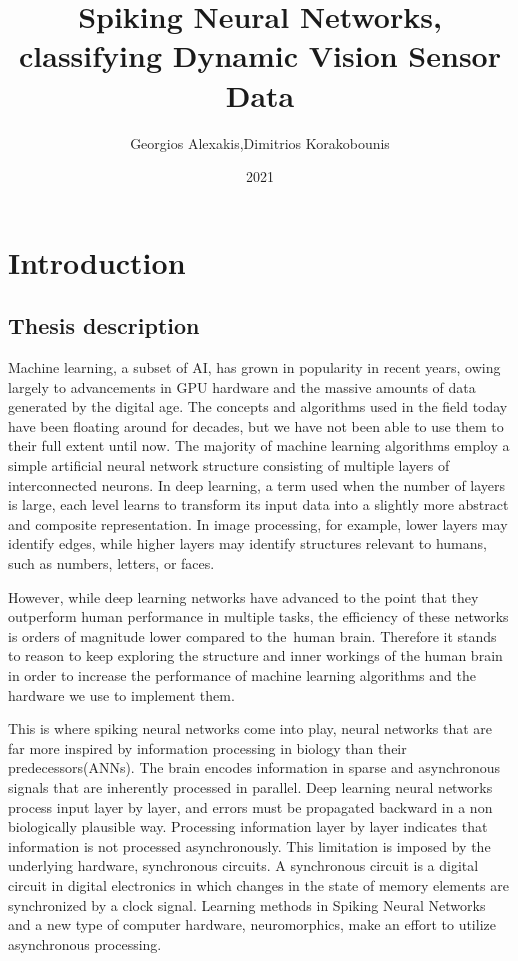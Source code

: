 \documentclass{report}
\title{Spiking Neural Networks, classifying Dynamic Vision Sensor Data }
\author{Georgios Alexakis,Dimitrios Korakobounis}
\date{2021}
\begin{document}
\maketitle

\tableofcontents{}
\chapter{Introduction}
     
\section{Thesis description}

Machine learning, a subset of AI, has grown in popularity in recent years, owing largely to advancements in GPU hardware and the massive amounts of data generated by the digital age. The concepts and algorithms used in the field today have been floating around for decades, but we have not been able to use them to their full extent until now. The majority of machine learning algorithms employ a simple artificial neural network structure consisting of multiple layers of interconnected neurons. In deep learning, a term used when the number of layers is large, each level learns to transform its input data into a slightly more abstract and composite representation. In image processing, for example, lower layers may identify edges, while higher layers may identify structures relevant to humans, such as numbers, letters, or faces.

However, while deep learning networks have advanced to the point that they outperform human performance in multiple tasks, the efficiency of these networks is orders of magnitude lower compared to the human brain. Therefore it stands to reason to keep exploring the structure and inner workings of the human brain in order to increase the performance of machine learning algorithms and the hardware we use to implement them. 

This is where spiking neural networks come into play, neural networks that are far more inspired by information processing in biology than their predecessors(ANNs). The brain encodes information in sparse and asynchronous signals that are inherently processed in parallel. Deep learning neural networks process input layer by layer, and errors must be propagated backward in a non biologically plausible way. Processing information layer by layer indicates that information is not processed asynchronously. This limitation is imposed by the underlying hardware, synchronous circuits. A synchronous circuit is a digital circuit in digital electronics in which changes in the state of memory elements are synchronized by a clock signal. Learning methods in Spiking Neural Networks and a new type of computer hardware, neuromorphics, make an effort to utilize asynchronous processing.
\end{document}
